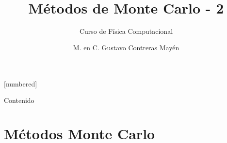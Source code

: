 



\normalfont
\usepackage{ccfonts}%
\usepackage[T1]{fontenc}%
\renewcommand{\rmdefault}{cmr}%
\linespread{1.3}
\title{Métodos de Monte Carlo - 2}
\subtitle{Curso de Física Computacional}
\author[]{M. en C. Gustavo Contreras Mayén}
[numbered]
\beamertemplatenavigationsymbolsempty

\newcommand{\localtextbulletone}{\textcolor{gray}{\raisebox{.45ex}{\rule{.6ex}{.6ex}}}}
\maketitle
\fontsize{14}{14}\selectfont
{}
\begin{frame}{Contenido}
\tableofcontents[pausesections]
\end{frame}
\section{Métodos Monte Carlo}
